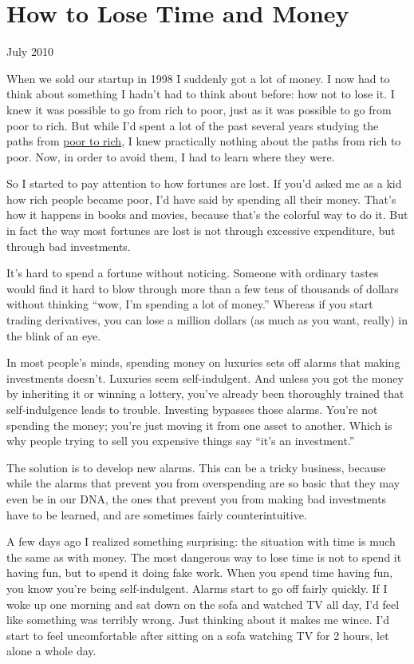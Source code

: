 \chapter{How to Lose Time and Money }

July 2010

When we sold our startup in 1998 I suddenly got a lot of money. I now
had to think about something I hadn't had to think about before: how not
to lose it. I knew it was possible to go from rich to poor, just as it
was possible to go from poor to rich. But while I'd spent a lot of the
past several years studying the paths from \href{wealth.html}{poor to
rich}, I knew practically nothing about the paths from rich to poor.
Now, in order to avoid them, I had to learn where they were.

So I started to pay attention to how fortunes are lost. If you'd asked
me as a kid how rich people became poor, I'd have said by spending all
their money. That's how it happens in books and movies, because that's
the colorful way to do it. But in fact the way most fortunes are lost is
not through excessive expenditure, but through bad investments.

It's hard to spend a fortune without noticing. Someone with ordinary
tastes would find it hard to blow through more than a few tens of
thousands of dollars without thinking ``wow, I'm spending a lot of
money.'' Whereas if you start trading derivatives, you can lose a
million dollars (as much as you want, really) in the blink of an eye.

In most people's minds, spending money on luxuries sets off alarms that
making investments doesn't. Luxuries seem self-indulgent. And unless you
got the money by inheriting it or winning a lottery, you've already been
thoroughly trained that self-indulgence leads to trouble. Investing
bypasses those alarms. You're not spending the money; you're just moving
it from one asset to another. Which is why people trying to sell you
expensive things say ``it's an investment.''

The solution is to develop new alarms. This can be a tricky business,
because while the alarms that prevent you from overspending are so basic
that they may even be in our DNA, the ones that prevent you from making
bad investments have to be learned, and are sometimes fairly
counterintuitive.

A few days ago I realized something surprising: the situation with time
is much the same as with money. The most dangerous way to lose time is
not to spend it having fun, but to spend it doing fake work. When you
spend time having fun, you know you're being self-indulgent. Alarms
start to go off fairly quickly. If I woke up one morning and sat down on
the sofa and watched TV all day, I'd feel like something was terribly
wrong. Just thinking about it makes me wince. I'd start to feel
uncomfortable after sitting on a sofa watching TV for 2 hours, let alone
a whole day.

